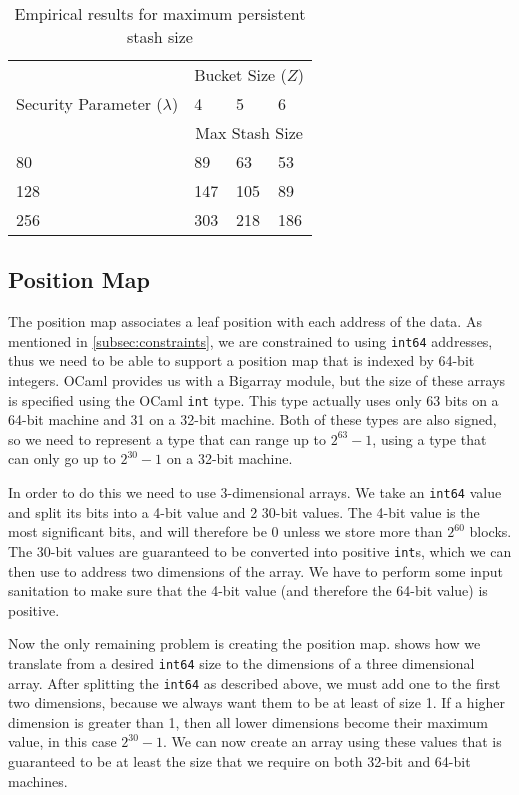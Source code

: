 \documentclass[12pt,a4paper,twoside,openright]{report}
\begin{document}
\begin{table}
\centering
\begin{tabular}{|l|l|l|l|}
	\hline
	& \multicolumn{3}{c|}{Bucket Size ($Z$)} \\
	\cline{2-4}
	Security Parameter ($\lambda$) & 4 & 5 & 6 \\
	\cline{2-4}
	& \multicolumn{3}{c|}{Max Stash Size} \\
	\hline
	80 & 89 & 63 & 53 \\
	\hline
	128 & 147 & 105 & 89 \\
	\hline
	256 & 303 & 218 & 186 \\
	\hline
\end{tabular}
\caption{Empirical results for maximum persistent stash size}
\label{tab:stashsizes}
\end{table}

\subsection{Position Map}

The position map associates a leaf position with each address of the data. As mentioned in \cref{subsec:constraints}, we are constrained to using \texttt{int64} addresses, thus we need to be able to support a position map that is indexed by 64-bit integers. OCaml provides us with a Bigarray module, but the size of these arrays is specified using the OCaml \texttt{int} type. This type actually uses only 63 bits on a 64-bit machine and 31 on a 32-bit machine. Both of these types are also signed, so we need to represent a type that can range up to $2^{63} - 1$, using a type that can only go up to $2^{30} - 1$ on a 32-bit machine.

In order to do this we need to use 3-dimensional arrays. We take an \texttt{int64} value and split its bits into a 4-bit value and 2 30-bit values. The 4-bit value is the most significant bits, and will therefore be 0 unless we store more than $2^{60}$ blocks. The 30-bit values are guaranteed to be converted into positive \texttt{int}s, which we can then use to address two dimensions of the array. We have to perform some input sanitation to make sure that the 4-bit value (and therefore the 64-bit value) is positive.

Now the only remaining problem is creating the position map.  shows how we translate from a desired \texttt{int64} size to the dimensions of a three dimensional array. After splitting the \texttt{int64} as described above, we must add one to the first two dimensions, because we always want them to be at least of size 1. If a higher dimension is greater than 1, then all lower dimensions become their maximum value, in this case $2^{30}-1$. We can now create an array using these values that is guaranteed to be at least the size that we require on both 32-bit and 64-bit machines.
\end{document}
